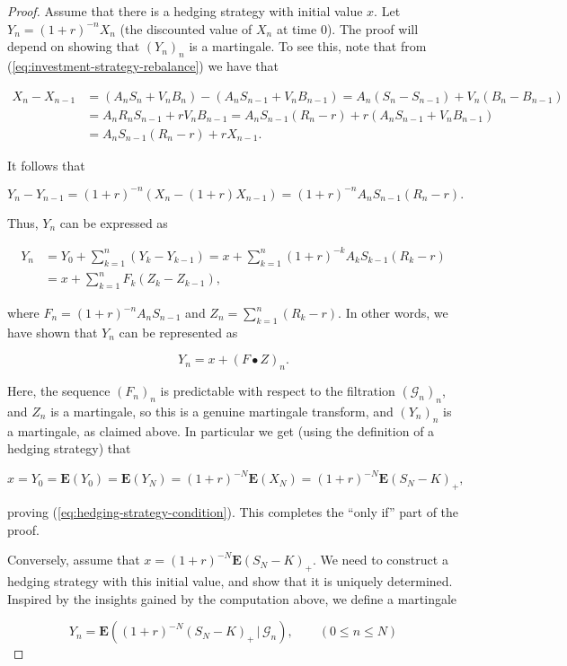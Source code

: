 \documentclass[11pt]{report}
\theoremstyle{plain}
\theoremstyle{definition}
\begin{document}
\begin{proof}
Assume that there is a hedging strategy with initial value $x$. Let $Y_n = (1+r)^{-n} X_n$ (the discounted value of $X_n$ at time $0$). The proof will depend on showing that $(Y_n)_n$ is a martingale. To see this, note that from (\ref{eq:investment-strategy-rebalance}) we have that

\begin{align*}
X_n - X_{n-1} &= (A_n S_n + V_n B_n) - (A_n S_{n-1} + V_n B_{n-1})
= A_n (S_n-S_{n-1}) + V_n (B_n-B_{n-1}) \\
&= A_n R_n S_{n-1} + r V_n B_{n-1} = A_n S_{n-1}(R_n-r) + r(A_n S_{n-1} + V_n B_{n-1}) \\
&= A_n S_{n-1} (R_n-r) + r X_{n-1}.
\end{align*}

It follows that

\[
Y_n-Y_{n-1} = (1+r)^{-n}(X_n-(1+r)X_{n-1}) = (1+r)^{-n}A_n S_{n-1}(R_n-r).
\]

Thus, $Y_n$ can be expressed as

\begin{align*}
Y_n &= Y_0 + \sum_{k=1}^n (Y_k-Y_{k-1}) =
x + \sum_{k=1}^n (1+r)^{-k}A_k S_{k-1} (R_k-r) \\
&= x + \sum_{k=1}^n F_k (Z_k-Z_{k-1}),
\end{align*}

where $F_n = (1+r)^{-n} A_n S_{n-1}$ and $Z_n = \sum_{k=1}^n (R_k-r)$. In other words, we have shown that $Y_n$ can be represented as

\[
Y_n = x + (F\bullet Z)_n.
\]

Here, the sequence $(F_n)_n$ is predictable with respect to the filtration $(\mathcal{G}_n)_n$, and $Z_n$ is a martingale, so this is a genuine martingale transform, and $(Y_n)_n$ is a martingale, as claimed above. In particular we get (using the definition of a hedging strategy) that

\[
x = Y_0 = \mathbf{E}(Y_0) = \mathbf{E}(Y_N) = (1+r)^{-N} \mathbf{E}(X_N) = (1+r)^{-N} \mathbf{E}(S_N-K)_+,
\]

proving (\ref{eq:hedging-strategy-condition}). This completes the ``only if'' part of the proof.

Conversely, assume that $x=(1+r)^{-N} \mathbf{E}(S_N-K)_+$. We need to construct a hedging strategy with this initial value, and show that it is uniquely determined. Inspired by the insights gained by the computation above, we define a martingale

\[
Y_n = \mathbf{E}\left((1+r)^{-N}(S_N-K)_+\,|\,\mathcal{G}_n\right), \qquad (0\le n\le N)
\]


\end{proof}
\end{document}

